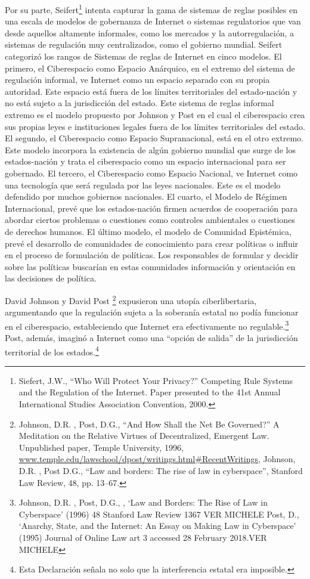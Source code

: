 \documentclass[12pt]{report} %
\begin{document}
Por su parte, Seifert\footnote{Siefert, J.W., “Who Will Protect Your Privacy?” Competing Rule Systems and the Regulation of
the Internet. Paper presented to the 41st Annual International Studies Association Convention, 2000.}  intenta capturar la gama de sistemas de reglas posibles en una escala de modelos de gobernanza de Internet o sistemas regulatorios que van desde aquellos altamente informales, como los mercados y la autorregulación, a sistemas de regulación muy centralizados, como el gobierno mundial. Seifert categorizó los rangos de Sistemas de reglas de Internet en cinco modelos. El primero, el Ciberespacio como Espacio Anárquico, en el extremo del sistema de regulación informal, ve Internet como un espacio separado con su propia autoridad. Este espacio está fuera de los límites territoriales del estado-nación y no está sujeto a la jurisdicción del estado. Este sistema de reglas informal extremo es el modelo propuesto por Johnson y Post en el cual el ciberespacio crea sus propias leyes e instituciones legales fuera de los límites territoriales del estado. El segundo, el Ciberespacio como Espacio Supranacional, está en el otro extremo. Este modelo incorpora la existencia de algún gobierno mundial que surge de los estados-nación y trata el ciberespacio como un espacio internacional para ser gobernado. El tercero, el Ciberespacio como Espacio Nacional, ve Internet como una tecnología que será regulada por las leyes nacionales. Este es el modelo defendido por muchos gobiernos nacionales. El cuarto, el Modelo de Régimen Internacional, prevé que los estados-nación firmen acuerdos de cooperación para abordar ciertos problemas o cuestiones como controles ambientales o cuestiones de derechos humanos. El último modelo, el modelo de Comunidad Epistémica, prevé el desarrollo de comunidades de conocimiento para crear políticas o influir en el proceso de formulación de políticas. Los responsables de formular y decidir sobre las políticas buscarían en estas comunidades información y orientación en las decisiones de política.


David Johnson y David Post \footnote{Johnson, D.R. , Post, D.G.,  “And How Shall the Net Be Governed?” A Meditation on the Relative Virtues of Decentralized, Emergent Law. Unpublished paper, Temple University, 1996, \url{www.temple.edu/lawschool/dpost/writings.html\#RecentWritings},  Johnson, D.R. , Post D.G., “Law and borders: The rise of law in cyberspace”, Stanford Law Review, 48, pp. 13–67.} expusieron una utopía ciberlibertaria, argumentando que la regulación sujeta a la soberanía estatal no podía funcionar en el ciberespacio, estableciendo que Internet era efectivamente no 
regulable.\footnote{Johnson, D.R. , Post, D.G.,  , ‘Law and Borders: The Rise of Law in Cyberspace’ (1996) 48 Stanford Law Review 1367 VER MICHELE
  Post, D., ‘Anarchy, State, and the Internet: An Essay on Making Law in Cyberspace’ (1995) Journal of Online Law art 3 accessed 28 February 2018.VER MICHELE}  Post, además, imaginó a Internet como una “opción de salida” de la jurisdicción territorial de los estados.\footnote{Esta Declaración señala no solo que la interferencia estatal era imposible.}  
  
\end{document}
